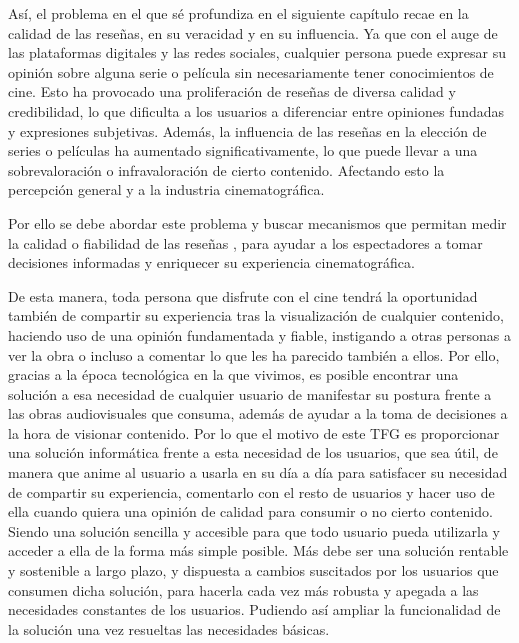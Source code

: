 Así, el problema en el que sé profundiza en el siguiente capítulo recae en la calidad de las reseñas, en su veracidad y en su influencia. Ya que con el auge de las plataformas digitales y las redes sociales, cualquier persona puede expresar su opinión sobre alguna serie o película sin necesariamente tener conocimientos de cine. Esto ha provocado una proliferación de reseñas de diversa calidad y credibilidad, lo que dificulta a los usuarios a diferenciar entre opiniones fundadas y expresiones subjetivas. Además, la influencia de las reseñas en la elección de series o películas ha aumentado significativamente, lo que puede llevar a una sobrevaloración o infravaloración de cierto contenido. Afectando esto la percepción general y a la industria cinematográfica.

Por ello se debe abordar este problema y buscar mecanismos que permitan medir la calidad o fiabilidad 
de las reseñas \cite{RRbyProfeMC}, para ayudar a los espectadores a tomar decisiones informadas \cite{RSforMovieRRating} y enriquecer su 
experiencia cinematográfica.

De esta manera, toda persona que disfrute con el cine tendrá la oportunidad también de compartir su 
experiencia tras la visualización de cualquier contenido, haciendo uso de una opinión fundamentada y 
fiable, instigando a otras personas a ver la obra o incluso a comentar lo que les ha parecido también a 
ellos. Por ello, gracias a la época tecnológica en la que vivimos, es posible encontrar una solución a 
esa necesidad de cualquier usuario de manifestar su postura frente a las obras audiovisuales que 
consuma, además de ayudar a la toma de decisiones a la hora de visionar contenido. Por lo que el motivo 
de este TFG es proporcionar una solución informática frente a esta necesidad de los usuarios, que sea 
útil, de manera que anime al usuario a usarla en su día a día para satisfacer su necesidad de compartir 
su experiencia, comentarlo con el resto de usuarios y hacer uso de ella cuando quiera una opinión de 
calidad para consumir o no cierto contenido. Siendo una solución sencilla y accesible para que todo 
usuario pueda utilizarla y acceder a ella de la forma más simple posible. Más debe ser una solución 
rentable y sostenible a largo plazo, y dispuesta a cambios suscitados por los usuarios que consumen 
dicha solución, para hacerla cada vez más robusta y apegada a las necesidades constantes de los 
usuarios. Pudiendo así ampliar la funcionalidad de la solución una vez resueltas las necesidades 
básicas. 

